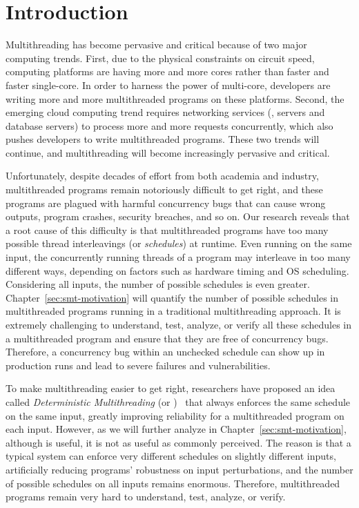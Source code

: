 \chapter{Introduction} \label{sec:intro}

Multithreading has become pervasive and critical because of two major computing
trends. First, due to the physical constraints on circuit speed, computing
platforms are having more and more cores rather than faster and faster
single-core. In order to harness the power of multi-core, developers are 
writing more and more multithreaded programs on these platforms. Second, the 
emerging cloud computing trend requires networking services (\eg, \http servers 
and database servers) to process more and more requests concurrently, which 
also pushes developers to write multithreaded programs. These two 
trends will continue, and multithreading will become increasingly pervasive and 
critical.

Unfortunately, despite decades of effort from both academia and industry,
multithreaded programs remain notoriously difficult to get right, and these
programs are plagued with harmful concurrency bugs that can cause wrong outputs,
program crashes, security breaches, and so on. Our research reveals that a root
cause of this difficulty is that multithreaded programs have too many
possible thread interleavings (or \emph{schedules}) at runtime. Even running on 
the same input, the concurrently running threads of a program may interleave in 
too many different ways, depending on factors such as hardware timing and OS
scheduling. Considering all inputs, the number of possible schedules is even
greater. Chapter~\ref{sec:smt-motivation} will quantify the number of
possible schedules in multithreaded programs running in a traditional
multithreading approach. It is extremely challenging to understand, test, 
analyze, or verify all these schedules in a multithreaded program and 
ensure that they are free of concurrency bugs. Therefore, a concurrency bug 
within an unchecked schedule can show up in production runs and lead to severe 
failures and vulnerabilities.

To make multithreading easier to get right, researchers have proposed an idea 
called \emph{Deterministic Multithreading} (or 
\emph{\dmt})~\cite{dthreads:sosp11, dpj:oopsla09, dmp:asplos09, kendo:asplos09, 
coredet:asplos10} that always enforces the same schedule on the same input, 
greatly improving reliability for a multithreaded program on each input. 
However, as we will further analyze in
Chapter~\ref{sec:smt-motivation}, although \dmt is useful, it is not as useful
as commonly perceived. The reason is that a typical \dmt system can enforce
very different schedules on slightly different inputs, artificially reducing
programs' robustness on input perturbations, and the number of possible
schedules on all inputs remains enormous. Therefore, multithreaded programs
remain very hard to understand, test, analyze, or verify.

